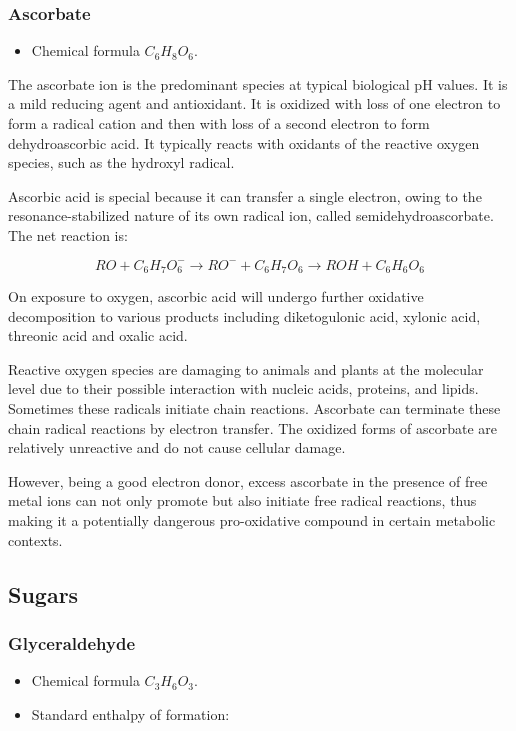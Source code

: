 \documentclass{article}
\begin{document}
\subsubsection{Ascorbate}
\begin{itemize}
    \item Chemical formula $C_6H_8O_6$.
\end{itemize}
The ascorbate ion is the predominant species at typical biological pH values. It is a mild
reducing agent and antioxidant. It is oxidized with loss of one electron to form a radical
cation and then with loss of a second electron to form dehydroascorbic acid. It typically
reacts with oxidants of the reactive oxygen species, such as the hydroxyl radical.

Ascorbic acid is special because it can transfer a single electron, owing to the
resonance-stabilized nature of its own radical ion, called semidehydroascorbate. The net
reaction is:

\[
    RO + C_6H_7O_6^- \rightarrow RO^− + C_6H_7O_6 \rightarrow ROH + C_6H_6O_6
\]

On exposure to oxygen, ascorbic acid will undergo further oxidative decomposition to
various products including diketogulonic acid, xylonic acid, threonic acid and oxalic
acid.

Reactive oxygen species are damaging to animals and plants at the molecular level due to
their possible interaction with nucleic acids, proteins, and lipids. Sometimes these
radicals initiate chain reactions. Ascorbate can terminate these chain radical reactions
by electron transfer. The oxidized forms of ascorbate are relatively unreactive and do not
cause cellular damage.

However, being a good electron donor, excess ascorbate in the presence of free metal ions
can not only promote but also initiate free radical reactions, thus making it a
potentially dangerous pro-oxidative compound in certain metabolic contexts.

\subsection{Sugars}

\subsubsection{Glyceraldehyde}
\begin{itemize}
    \item Chemical formula $C_3H_6O_3$.
    \item Standard enthalpy of formation:
\end{itemize}
\end{document}
